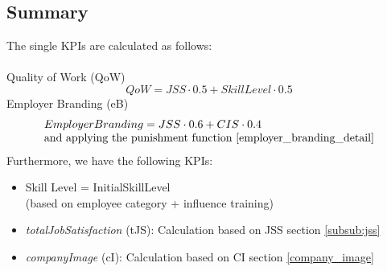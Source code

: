 \subsection{Summary}

The single KPIs are calculated as follows:\\\\
Quality of Work (\gls{QoW})
\begin{equation}
     QoW = JSS \cdot 0.5 + SkillLevel \cdot 0.5   
     \label{QoW}
\end{equation}
Employer Branding (\gls{eB})
\begin{equation}
  \begin{array}{l}
     Employer Branding = JSS \cdot 0.6 + CIS \cdot 0.4 \\ 
    \text{and applying the punishment function \ref{employer_branding_detail}} 
  \end{array}
\end{equation}
Furthermore, we have the following KPIs:

\begin{itemize}
\item Skill Level = InitialSkillLevel \\
(based on employee category + influence training)
\item \textit{totalJobSatisfaction} (tJS): Calculation based on JSS section \ref{subsub:jss}
\item \textit{companyImage} (cI): Calculation based on CI section \ref{company_image}
\end{itemize}